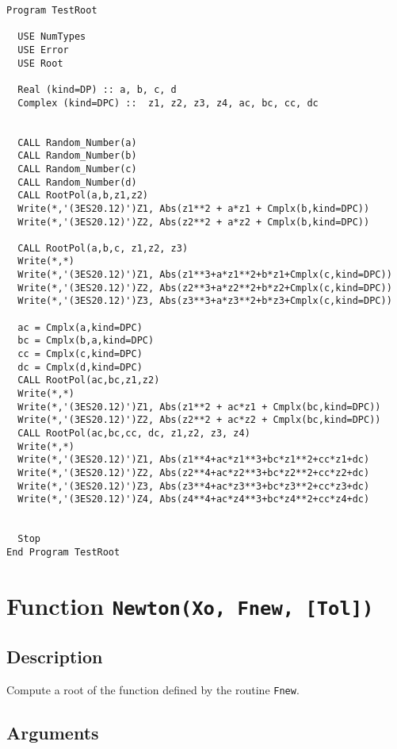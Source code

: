 \begin{lstlisting}[emph=RootPol,
                   emphstyle=\color{blue},
                   frame=trBL,
                   caption=Computing roots of polynomials.,
                   label=rootpol]
Program TestRoot

  USE NumTypes
  USE Error
  USE Root

  Real (kind=DP) :: a, b, c, d
  Complex (kind=DPC) ::  z1, z2, z3, z4, ac, bc, cc, dc


  CALL Random_Number(a)
  CALL Random_Number(b)
  CALL Random_Number(c)
  CALL Random_Number(d)
  CALL RootPol(a,b,z1,z2)
  Write(*,'(3ES20.12)')Z1, Abs(z1**2 + a*z1 + Cmplx(b,kind=DPC))
  Write(*,'(3ES20.12)')Z2, Abs(z2**2 + a*z2 + Cmplx(b,kind=DPC))

  CALL RootPol(a,b,c, z1,z2, z3)
  Write(*,*)
  Write(*,'(3ES20.12)')Z1, Abs(z1**3+a*z1**2+b*z1+Cmplx(c,kind=DPC))
  Write(*,'(3ES20.12)')Z2, Abs(z2**3+a*z2**2+b*z2+Cmplx(c,kind=DPC))
  Write(*,'(3ES20.12)')Z3, Abs(z3**3+a*z3**2+b*z3+Cmplx(c,kind=DPC))

  ac = Cmplx(a,kind=DPC)
  bc = Cmplx(b,a,kind=DPC)
  cc = Cmplx(c,kind=DPC)
  dc = Cmplx(d,kind=DPC)
  CALL RootPol(ac,bc,z1,z2)
  Write(*,*)
  Write(*,'(3ES20.12)')Z1, Abs(z1**2 + ac*z1 + Cmplx(bc,kind=DPC))
  Write(*,'(3ES20.12)')Z2, Abs(z2**2 + ac*z2 + Cmplx(bc,kind=DPC))
  CALL RootPol(ac,bc,cc, dc, z1,z2, z3, z4)
  Write(*,*)
  Write(*,'(3ES20.12)')Z1, Abs(z1**4+ac*z1**3+bc*z1**2+cc*z1+dc)
  Write(*,'(3ES20.12)')Z2, Abs(z2**4+ac*z2**3+bc*z2**2+cc*z2+dc)
  Write(*,'(3ES20.12)')Z3, Abs(z3**4+ac*z3**3+bc*z3**2+cc*z3+dc)
  Write(*,'(3ES20.12)')Z4, Abs(z4**4+ac*z4**3+bc*z4**2+cc*z4+dc)


  Stop
End Program TestRoot
\end{lstlisting}

\section{Function \texttt{Newton(Xo,  Fnew,  [Tol]) }}

\subsection{Description}

Compute a root of the function defined by the routine \texttt{Fnew}.

\subsection{Arguments}

